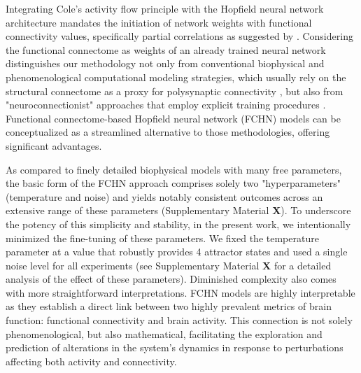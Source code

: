 \documentclass{article}
\begin{document}
Integrating Cole's activity flow principle with the Hopfield neural network architecture mandates the initiation of network weights with functional connectivity values, specifically partial correlations as suggested by \citet{cole2016activity}.
Considering the functional connectome as weights of an already trained neural network distinguishes our methodology not only from conventional biophysical and phenomenological computational modeling strategies, which usually rely on the structural connectome as a proxy for polysynaptic connectivity \citep{cabral2017functional}, but also from "neuroconnectionist" approaches that employ explicit training procedures \citep{doerig2023neuroconnectionist}.
Functional connectome-based Hopfield neural network (FCHN) models can be conceptualized as a streamlined alternative to those methodologies, offering significant advantages.

As compared to finely detailed biophysical models with many free parameters, the basic form of the FCHN approach comprises solely two "hyperparameters" (temperature and noise) and yields notably consistent outcomes across an extensive range of these parameters (Supplementary Material \textbf{X}). To underscore the potency of this simplicity and stability, in the present work, we intentionally minimized the fine-tuning of these parameters. We fixed the temperature parameter at a value that robustly provides 4 attractor states and used a single noise level for all experiments (see Supplementary Material \textbf{X} for a detailed analysis of the effect of these parameters). Diminished complexity also comes with more straightforward interpretations. FCHN models are highly interpretable as they establish a direct link between two highly prevalent metrics of brain function: functional connectivity and brain activity. This connection is not solely phenomenological, but also mathematical, facilitating the exploration and prediction of alterations in the system's dynamics in response to perturbations affecting both activity and connectivity.
\end{document}
